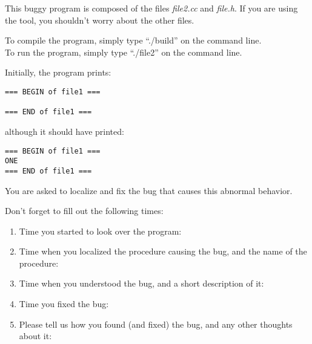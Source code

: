 \documentclass{article}
\title{}
\author{Debugging experiment - Bug 4}
\date{July 30, 2003}
\begin{document}
\maketitle
\begin{flushleft}
\vspace{0.5in}

\thispagestyle{empty}

This buggy program is composed of the files {\it file2.cc} and 
{\it file.h}. If you are using the tool, you shouldn't worry about the 
other files.

\vspace{0.1in}
To compile the program, simply type ``./build'' on the command line.\\
To run the program, simply type ``./file2'' on the command line.


\vspace{0.1in}
Initially, the program prints:

\begin{verbatim}
=== BEGIN of file1 ===

=== END of file1 ===
\end{verbatim}

although it should have printed:
\begin{verbatim}
=== BEGIN of file1 ===
ONE
=== END of file1 ===
\end{verbatim}


You are asked to localize and fix the bug that causes this abnormal behavior.


\vspace{0.3in}
Don't forget to fill out the following times:
\begin{enumerate}
\item{Time you started to look over the program:}
\item{Time when you localized the procedure causing the bug, and the name
      of the procedure:\vspace{0.2in}}
\item{Time when you understood the bug, and a short description of it:\vspace{0.4in}}

\item{Time you fixed the bug:}

\item{Please tell us how you found (and fixed) the bug, and any other thoughts 
about it:}

\end{enumerate}

\end{flushleft}
\end{document}

